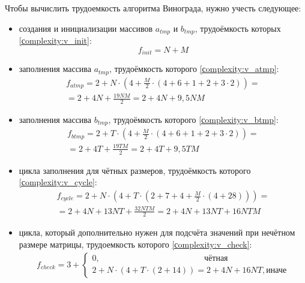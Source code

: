 Чтобы вычислить трудоемкость алгоритма Винограда, нужно учесть следующее:
\begin{itemize}
	\item создания и инициализации массивов $a_{tmp}$ и $b_{tmp}$, трудоёмкость которых \ref{сomplexity:v_init}:
	\begin{equation}
		\label{сomplexity:v_init}
		f_{init} = N + M
	\end{equation}
	\item заполнения массива $a_{tmp}$, трудоёмкость которого \ref{сomplexity:v_atmp}:
	\begin{equation}
		\label{сomplexity:v_atmp}
		\begin{aligned}
			f_{atmp} = 2 + N \cdot (4 + \frac{M}{2} \cdot (4 + 6 + 1 + 2 + 3 \cdot 2)) = \\
			= 2 + 4N + \frac{19NM}{2} = 2 + 4N + 9,5NM
		\end{aligned} 
	\end{equation}
	\item заполнения массива $b_{tmp}$, трудоёмкость которого \ref{сomplexity:v_btmp}:
	\begin{equation}
		\label{сomplexity:v_btmp}
		\begin{aligned}
			f_{btmp} = 2 + T \cdot (4 + \frac{M}{2} \cdot (4 + 6 + 1 + 2 + 3 \cdot 2)) = \\
			= 2 + 4T + \frac{19TM}{2} = 2 + 4T + 9,5TM
		\end{aligned}  
	\end{equation}
	\item цикла заполнения для чётных размеров, трудоёмкость которого \ref{сomplexity:v_cycle}:
	\begin{equation}
		\label{сomplexity:v_cycle}
		\begin{aligned}
			f_{cycle} = 2 + N \cdot (4 + T \cdot (2 + 7 + 4 + \frac{M}{2} \cdot (4 + 28))) = \\
			= 2 + 4N + 13NT + \frac{32NTM}{2}  = 2 + 4N + 13NT + 16NTM 
		\end{aligned}
	\end{equation}
	\item цикла, который дополнительно нужен для подсчёта значений при нечётном размере матрицы, трудоемкость которого \ref{сomplexity:v_check}:
	\begin{equation}
		\label{сomplexity:v_check}
		\begin{aligned}
			f_{check} = 3 + 
			\begin{cases}
				0,~~~~~~~~~~~~~~~~~~~~~~~~~~~~~~~~~~~~~~~~~~~~~~~~~~~~~~~~\text{чётная} \\
				2 + N \cdot (4 + T \cdot (2 + 14)) = 2 + 4N + 16NT,\text{иначе}
			\end{cases}
		\end{aligned}  
	\end{equation}
\end{itemize}

